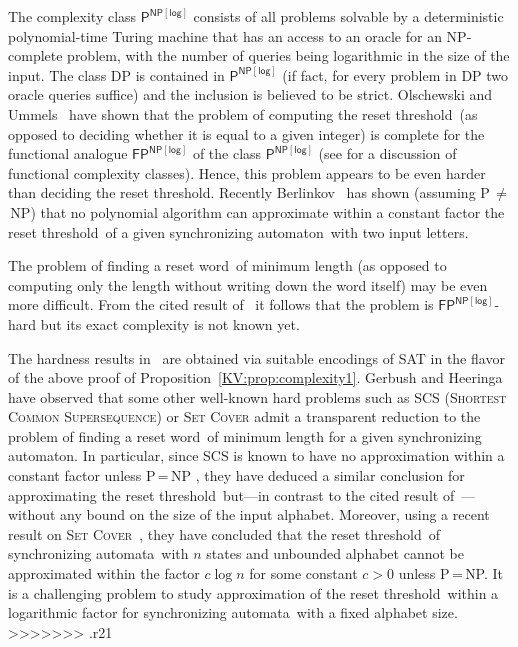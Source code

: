 \documentclass{irmaart}
\newcommand{\sa}{synchronizing au\-tom\-a\-ta}
\newcommand{\san}{synchronizing au\-tom\-a\-ton}
\newcommand{\sw}{reset word}
\newcommand{\rt}{reset threshold}
\theoremstyle{plain}
\begin{document}
The complexity class $\mathsf{P}^\mathsf{NP[log]}$ consists of all problems
solvable by a deterministic polynomial-time Turing machine that has an access
to an oracle for an \textsf{NP}-complete problem, with the number of queries
being logarithmic in the size of the input. The class \textsf{DP} is contained
in $\mathsf{P}^\mathsf{NP[log]}$ (if fact, for every problem in \textsf{DP} two
oracle queries suffice) and the inclusion is believed to be strict. Olschewski
and Ummels~\cite{Olschewski&Ummels:2010} have shown that the problem of
computing the \rt\ (as opposed to deciding whether it is equal to a given
integer) is complete for the functional analogue $\mathsf{FP}^\mathsf{NP[log]}$
of the class $\mathsf{P}^\mathsf{NP[log]}$ (see \cite{Selman:1994} for a
discussion of functional complexity classes). Hence, this problem appears to be
even harder than deciding the \rt. Recently Berlinkov~\cite{Berlinkov:2010} has
shown (assuming \textsf{P}\,$\ne$\,\textsf{NP}) that no polynomial algorithm
can approximate within a constant factor the \rt\ of a given \san\ with two
input letters.

The problem of finding a \sw\ of minimum length (as opposed to computing only
the length without writing down the word itself) may be even more difficult.
From the cited result of~\cite{Olschewski&Ummels:2010} it follows that the
problem is $\mathsf{FP}^\mathsf{NP[log]}$-hard but its exact complexity is not
known yet.

The hardness results
in~\cite{Berlinkov:2010,Olschewski&Ummels:2010} are obtained via
suitable encodings of \textsc{SAT} in the flavor of the above
proof of Proposition~\ref{KV:prop:complexity1}. Gerbush and
Heeringa~\cite{Gerbush&Heeringa:2011} have observed that some
other well-known hard problems such as \textsc{SCS}
(\textsc{Shortest Common Supersequence}) or \textsc{Set Cover}
admit a transparent reduction to the problem of finding a \sw\ of
minimum length for a given \san. In particular, since \textsc{SCS}
is known to have no approximation within a constant factor unless
\textsf{P}\,=\,\textsf{NP} \cite{Jiang&Li:1995}, they have deduced
a similar conclusion for approximating the \rt\ but---in contrast
to the cited result of~\cite{Berlinkov:2010}---without any bound
on the size of the input alphabet. Moreover, using a recent result
on \textsc{Set Cover}~\cite{Alon&Moshkovitz&Safra:2006}, they have
concluded that the \rt\ of \sa\ with $n$ states and unbounded
alphabet cannot be approximated within the factor $c\log n$ for
some constant $c>0$ unless \textsf{P}\,=\,\textsf{NP}. It is a
challenging problem to study approximation of the \rt\ within a
logarithmic factor for \sa\ with a fixed alphabet size.
>>>>>>> .r21
\end{document}
